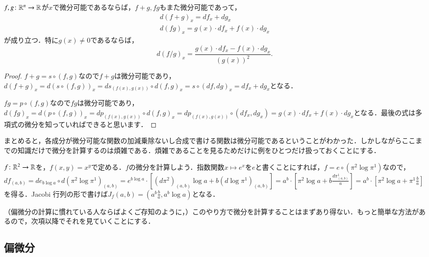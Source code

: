 \begin{cor}
$f, g \colon \mathbb{R}^n \to \mathbb{R}$が$x$で微分可能であるならば，$f+g, fg$もまた微分可能であって，
\begin{align}
d(f+g)_x = df_x+dg_x \\
d(fg)_x = g(x) \cdot df_x  + f(x) \cdot dg_x
\end{align}が成り立つ．特に$g (x) \neq 0$であるならば，
\begin{equation}
d(f/g)_x = \frac{g(x) \cdot df_x - f(x) \cdot dg_x}{(g(x))^2}.
\end{equation}
\end{cor}

\begin{proof}
$f+g = s \circ (f,g)$なので$f+g$は微分可能であり，$d(f+g)_x = d(s \circ (f,g))_x = ds_{(f(x), g(x))} \circ d(f,g)_x = s \circ (df,dg)_x = df_x + dg_x$となる．

$fg = p \circ(f,g)$なので$fg$は微分可能であり，$d(fg)_x = d(p \circ (f,g))_x = dp_{(f(x), g(x))} \circ d(f,g)_x = dp_{(f(x), g(x))} \circ (df_x,dg_x) = g(x) \cdot df_x  + f(x) \cdot dg_x$となる．最後の式は多項式の微分を知っていればできると思います．
\end{proof}

まとめると，各成分が微分可能な関数の加減乗除ないし合成で書ける関数は微分可能であるということがわかった．しかしながらここまでの知識だけで微分を計算するのは煩雑である．煩雑であることを見るためだけに例をひとつだけ扱っておくことにする．

\begin{exm}
$f \colon \mathbb{R}^2 \to \mathbb{R}$を，$f(x,y) = x^y$で定める．$f$の微分を計算しよう．指数関数$x \mapsto e^x$を$e$と書くことにすれば，$f = e \circ (\pi^2 \log \pi^1)$なので，$df _{(a,b)} = de_{b \log a} \circ d(\pi^2 \log \pi^1)_{(a,b)} 
= e^{b \log a} \cdot \left[ (d \pi^2 )_{(a,b)} \log a + b (d\log \pi^1)_{(a,b)} \right]
=a^b \cdot \left[ \pi^2 \log a + b  \frac{d \pi^1_{(a,b)}}{a} \right] = a^b\cdot \left[ \pi^2 \log a + \pi^1 \frac{b}{a} \right]$を得る．Jacobi 行列の形で書けば$J_f(a,b) = \left( a^b \frac{b}{a} , a^b \log a\right)$となる．
\end{exm}

（偏微分の計算に慣れている人ならばよくご存知のように，）このやり方で微分を計算することはまずあり得ない．もっと簡単な方法があるので，次項以降でそれを見ていくことにする．

\subsection{偏微分}

